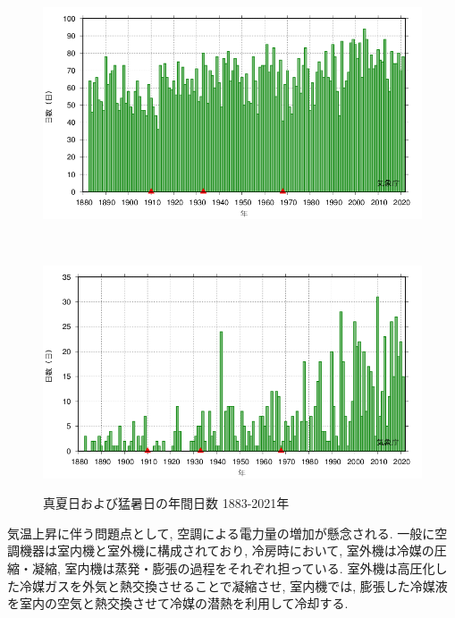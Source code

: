 \documentclass[a4j,fleqn,dvipdfmx,uplatex]{jsarticle}
\begin{document}
\begin{figure}[htb]
  \centering
  \begin{minipage}[b]{\linewidth}
      \centering
      \includegraphics[width=\linewidth]{img/OSAKA_tmaxGE30.png}
      \label{subfig1:temp_osaka}
    \end{minipage}\\
    \begin{minipage}[b]{\linewidth}
      \centering
      \includegraphics[width=\linewidth]{img/OSAKA_tmaxGE35.png}
      \label{subfig1:temp_osaka2}
    \end{minipage}
    \caption{真夏日および猛暑日の年間日数 1883-2021年\cite{temp_osaka3}}
    \label{fig1:temp_osaka}
\end{figure}
 
気温上昇に伴う問題点として, 空調による電力量の増加が懸念される. 
一般に空調機器は室内機と室外機に構成されており, 
冷房時において, 室外機は冷媒の圧縮・凝縮, 室内機は蒸発・膨張の過程をそれぞれ担っている. 
室外機は高圧化した冷媒ガスを外気と熱交換させることで凝縮させ, 
室内機では, 膨張した冷媒液を室内の空気と熱交換させて冷媒の潜熱を利用して冷却する. 
\end{document}
